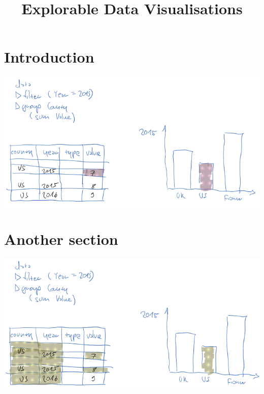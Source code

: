 \documentclass{vgtc}
\title{Explorable Data Visualisations}
\begin{document}
\maketitle

\section{Introduction}

\includegraphics[scale=0.35]{image/chart-fwd}

\cite{perera16d,ricciotti17}

\section{Another section}

\includegraphics[scale=0.35]{image/chart-bwd}

\acknowledgments{}


\end{document}
